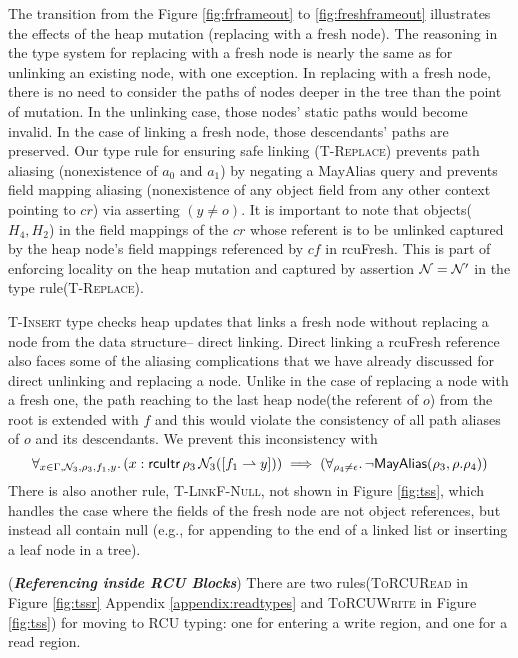 The transition from the Figure \ref{fig:frframeout} to \ref{fig:freshframeout} illustrates the effects of the heap mutation (replacing with a fresh node). The reasoning in the type system for replacing with a fresh node is nearly the same as for unlinking an existing node, with one exception.
In replacing with a fresh node, there is no need to consider the paths of nodes deeper in the tree than the point of mutation.  In the unlinking case, those nodes' static paths would become invalid.  In the case of linking a fresh node, those descendants' paths are preserved.
Our type rule for ensuring safe linking (\textsc{T-Replace}) prevents path aliasing (nonexistence of $a_0$ and $a_1$) by negating a \textsf{MayAlias} query and prevents field mapping aliasing (nonexistence of any object field from any other context pointing to $cr$) via asserting $(y\neq o)$. It is important to note that objects($H_4,H_2$) in the field mappings of the $cr$ whose referent is to be unlinked captured by the heap node's field mappings referenced by $cf$ in \textsf{rcuFresh}. This is part of enforcing locality on the heap mutation and captured by assertion $\mathcal{N} = \mathcal{N}'$ in the type rule(\textsc{T-Replace}). 

\textsc{T-Insert} type checks heap updates that links a fresh node without replacing a node from the data structure-- direct linking. Direct linking a \textsf{rcuFresh} reference also faces some of the aliasing complications that we have already discussed for direct unlinking and replacing a  node. Unlike in the case of replacing a node with a fresh one, the path reaching to the last heap node(the referent of $o$) from the root is extended with $f$ and this would violate the consistency of all path aliases of $o$ and its descendants. We prevent this inconsistency with
\[
\forall_{x \in \Gamma, \mathcal{N}_3, \rho_3,f_1,y} \ldotp (x:\textsf{rcuItr}\,\rho_3\,\mathcal{N}_3([f_1 \rightharpoonup y])) \implies
 (\forall_{\rho_4\neq \epsilon} \ldotp \neg\mathsf{MayAlias}(\rho_3, \rho.\rho_4) )
\]
There is also another rule, \textsc{T-LinkF-Null}, not shown in Figure \ref{fig:tss}, which handles the case where the fields of the fresh node are not object references, but instead all contain null (e.g., for appending to the end of a linked list or inserting a leaf node in a tree).

(\textit{\textbf{Referencing inside \textsf{RCU} Blocks}})
There are two rules(\textsc{ToRCURead} in Figure \ref{fig:tssr} Appendix \ref{appendix:readtypes} and \textsc{ToRCUWrite} in Figure \ref{fig:tss}) for moving to \textsf{RCU} typing: one for entering a write region, and one for a read region.
